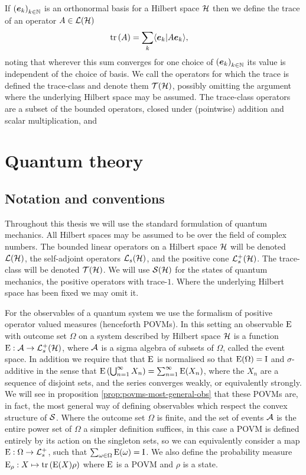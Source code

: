 If $\seq{\boe_k}[k\in\N]$ is an orthonormal basis for a Hilbert space $\mathcal{H}$ then we define the trace of an operator $A\in\bops[\hcal]$ 
\begin{align}
  \operatorname{tr}\left( A \right) &= \sum_k \langle \bm{e}_k|A\bm{e}_k\rangle,
\end{align}
noting that  wherever this sum converges for one choice of $\seq{\boe_k}[k\in\N]$ its value is independent of the choice of basis. We call the operators for which the trace is defined the trace-class and denote them $\trops[\hcal]$, possibly omitting the argument where the underlying Hilbert space may be assumed. The trace-class operators are a subset of the bounded operators, closed under (pointwise) addition and scalar multiplication, and 
\section{Quantum theory}

\subsection{Notation and conventions}

Throughout this thesis we will use the standard formulation of quantum mechanics. All Hilbert spaces may be assumed to be over the field of complex numbers. The bounded linear operators on a Hilbert space $\mathcal{H}$ will be denoted $\bops[\hcal]$, the self-adjoint operators $\saops[\hcal]$, and the positive cone $\posops[\hcal]$. The trace-class will be denoted $\trops[\hcal]$. We will use $\dops[\hcal]$ for the states of quantum mechanics, the positive operators with trace-$1$. Where the underlying Hilbert space has been fixed we may omit it. 

For the observables of a quantum system we use the formalism of positive operator valued measures (henceforth POVMs). In this setting an observable $\operatorname{E}$ with outcome set $\Omega$ on a system described by Hilbert space $\mathcal{H}$ is a function $\ope:\acal\to\posops[\hcal]$, where $\mathcal{A}$ is a sigma algebra of subsets of $\Omega$, called the event space. In addition we require that that $\operatorname{E}$ is normalised so that $\operatorname{E}(\Omega) = \operatorname{I}$ and $\sigma$-additive in the sense that $\operatorname{E}\left(\bigcup_{n=1}^\infty X_n\right) = \sum_{n=1}^\infty \operatorname{E}(X_n)$, where the $X_n$ are a sequence of disjoint sets, and  the series converges weakly, or equivalently strongly. We will see in proposition \ref{prop:povms-most-general-obs} that these POVMs are, in fact, the most general way of defining observables which respect the convex structure of $\dops$. Where the outcome set $\Omega$ is finite, and the set of events $\mathcal{A}$ is the entire power set of $\Omega$ a simpler definition suffices, in this case a POVM is defined entirely by its action on the singleton sets, so we can equivalently consider a map $\ope:\Omega\to\posops$, such that $\sum_{\omega\in\Omega} \operatorname{E}(\omega) = \operatorname{I}$. We also define the probability measure $\operatorname{E}_\rho:X\mapsto \operatorname{tr}\left( \operatorname{E}(X)\rho \right)$ where $\operatorname{E}$ is a POVM and $\rho$ is a state.


